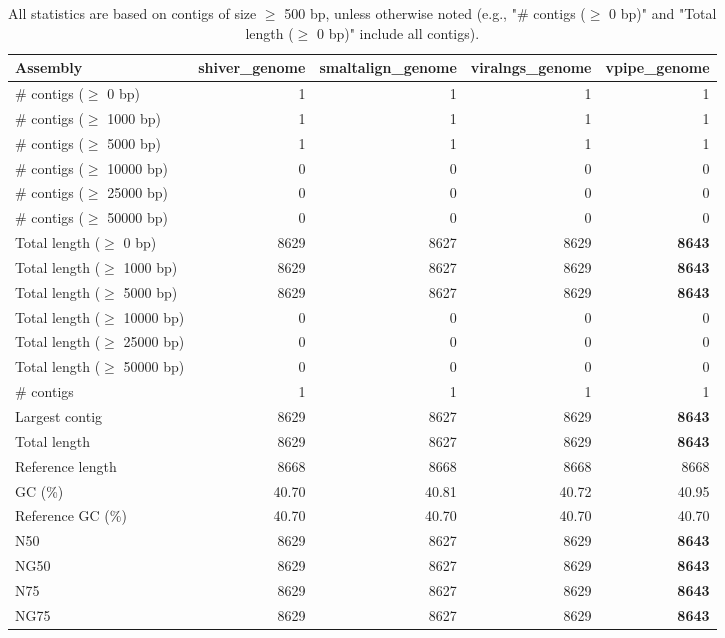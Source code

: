 \documentclass[12pt,a4paper]{article}
\begin{document}
\begin{table}[ht]
\begin{center}
\caption{All statistics are based on contigs of size $\geq$ 500 bp, unless otherwise noted (e.g., "\# contigs ($\geq$ 0 bp)" and "Total length ($\geq$ 0 bp)" include all contigs).}
\begin{tabular}{|l*{4}{|r}|}
\hline
Assembly & shiver\_genome & smaltalign\_genome & viralngs\_genome & vpipe\_genome \\ \hline
\# contigs ($\geq$ 0 bp) & 1 & 1 & 1 & 1 \\ \hline
\# contigs ($\geq$ 1000 bp) & 1 & 1 & 1 & 1 \\ \hline
\# contigs ($\geq$ 5000 bp) & 1 & 1 & 1 & 1 \\ \hline
\# contigs ($\geq$ 10000 bp) & 0 & 0 & 0 & 0 \\ \hline
\# contigs ($\geq$ 25000 bp) & 0 & 0 & 0 & 0 \\ \hline
\# contigs ($\geq$ 50000 bp) & 0 & 0 & 0 & 0 \\ \hline
Total length ($\geq$ 0 bp) & 8629 & 8627 & 8629 & {\bf 8643} \\ \hline
Total length ($\geq$ 1000 bp) & 8629 & 8627 & 8629 & {\bf 8643} \\ \hline
Total length ($\geq$ 5000 bp) & 8629 & 8627 & 8629 & {\bf 8643} \\ \hline
Total length ($\geq$ 10000 bp) & 0 & 0 & 0 & 0 \\ \hline
Total length ($\geq$ 25000 bp) & 0 & 0 & 0 & 0 \\ \hline
Total length ($\geq$ 50000 bp) & 0 & 0 & 0 & 0 \\ \hline
\# contigs & 1 & 1 & 1 & 1 \\ \hline
Largest contig & 8629 & 8627 & 8629 & {\bf 8643} \\ \hline
Total length & 8629 & 8627 & 8629 & {\bf 8643} \\ \hline
Reference length & 8668 & 8668 & 8668 & 8668 \\ \hline
GC (\%) & 40.70 & 40.81 & 40.72 & 40.95 \\ \hline
Reference GC (\%) & 40.70 & 40.70 & 40.70 & 40.70 \\ \hline
N50 & 8629 & 8627 & 8629 & {\bf 8643} \\ \hline
NG50 & 8629 & 8627 & 8629 & {\bf 8643} \\ \hline
N75 & 8629 & 8627 & 8629 & {\bf 8643} \\ \hline
NG75 & 8629 & 8627 & 8629 & {\bf 8643} \\ \hline

\end{tabular}
\end{center}
\end{table}
\end{document}
